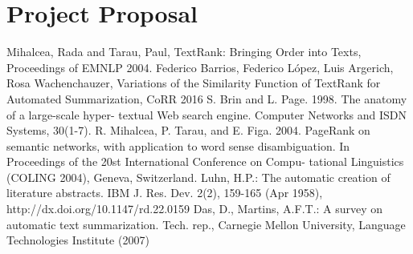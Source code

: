 \documentclass[twoside,twocolumn]{article}
\begin{document}
\section{Project Proposal}





\begin{thebibliography}{99}

 Mihalcea, Rada  and  Tarau, Paul, TextRank: Bringing Order into Texts, Proceedings of EMNLP 2004.
 Federico Barrios, Federico L{\'{o}}pez, Luis Argerich, Rosa Wachenchauzer, Variations of the Similarity Function of TextRank for Automated Summarization, CoRR 2016
 S. Brin and L. Page. 1998. The anatomy of a large-scale hyper- textual Web search engine. Computer Networks and ISDN Systems, 30(1-7).
 R. Mihalcea, P. Tarau, and E. Figa. 2004. PageRank on semantic networks, with application to word sense disambiguation. In Proceedings of the 20st International Conference on Compu- tational Linguistics (COLING 2004), Geneva, Switzerland.
 Luhn, H.P.: The automatic creation of literature abstracts. IBM J. Res. Dev. 2(2), 159-165 (Apr 1958), http://dx.doi.org/10.1147/rd.22.0159
 Das, D., Martins, A.F.T.: A survey on automatic text summarization. Tech. rep., Carnegie Mellon University, Language Technologies Institute (2007)

\end{thebibliography}



\end{document}
